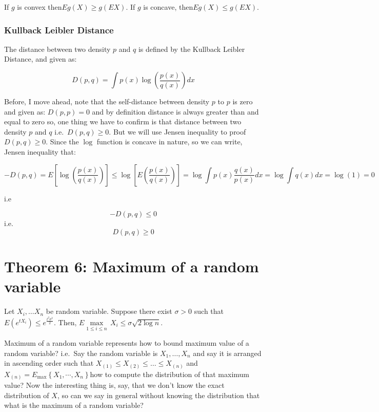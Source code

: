 \documentclass[
]{article}
\begin{document}
If \(g\) is convex then\(Eg\left( X \right)\ge g\left( EX \right)\). If
\(g\) is concave, then\(Eg\left( X \right)\le g\left( EX \right)\).

\hypertarget{kullback-leibler-distance}{%
\subsubsection{Kullback Leibler
Distance}\label{kullback-leibler-distance}}

The distance between two density \(p\) and \(q\) is defined by the
Kullback Leibler Distance, and given as:

\[D\left( p,q \right)=\int{p\left( x \right)\log \left( \frac{p\left( x \right)}{q\left( x \right)} \right)}dx\]

Before, I move ahead, note that the self-distance between density \(p\)
to \(p\) is zero and given as: \(D\left( p,p \right)=0\) and by
definition distance is always greater than and equal to zero so, one
thing we have to confirm is that distance between two density \(p\) and
\(q\) i.e.~\(D\left( p,q \right)\ge 0\). But we will use Jensen
inequality to proof \(D\left( p,q \right)\ge 0\). Since the \(\log\)
function is concave in nature, so we can write, Jensen inequality that:

\[-D\left( p,q \right)=E\left[ \log \left( \frac{p\left( x \right)}{q\left( x \right)} \right) \right]\le \log \left[ E\left( \frac{p\left( x \right)}{q\left( x \right)} \right) \right]=\log \int{p\left( x \right)\frac{q\left( x \right)}{p\left( x \right)}dx}=\log \int{q\left( x \right)dx}=\log \left( 1 \right)=0\]

i.e

\[-D\left( p,q \right)\le 0\] i.e.~\[D\left( p,q \right)\ge 0\]

\hypertarget{theorem-6-maximum-of-a-random-variable}{%
\section{Theorem 6: Maximum of a random
variable}\label{theorem-6-maximum-of-a-random-variable}}

Let \({{X}_{i}},\ldots {{X}_{n}}\) be random variable. Suppose there
exist \(\sigma >0\) such that
\(E\left( {{e}^{t{{X}_{i}}}} \right)\le {{e}^{\frac{{{t}^{2}}{{\sigma }^{2}}}{2}}}\).
Then,
\(E\underset{1\le i\le n}{\mathop{\max }}\,{{X}_{i}}\le \sigma \sqrt{2\log n}\).

Maximum of a random variable represents how to bound maximum value of a
random variable? i.e.~Say the random variable is
\({{X}_{1}},\ldots ,{{X}_{n}}\) and say it is arranged in ascending
order such that
\({{X}_{\left( 1 \right)}}\le {{X}_{\left( 2 \right)}}\le \ldots \le {{X}_{\left( n \right)}}\)
and
\({{X}_{\left( n \right)}}={{E}_{\max }}\left\{ {{X}_{1}},\cdots ,{{X}_{n}} \right\}\)how
to compute the distribution of that maximum value? Now the interesting
thing is, say, that we don't know the exact distribution of \(X\), so
can we say in general without knowing the distribution that what is the
maximum of a random variable?
\end{document}
